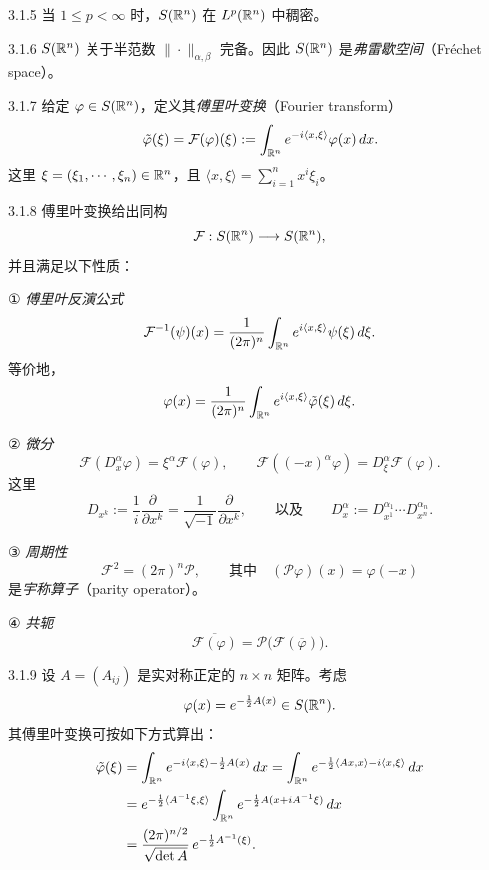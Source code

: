 
\begin{proposition}{3.1.5}
当 $1\le p<\infty$ 时，$S(\mathbb{R}^n)$ 在 $L^p(\mathbb{R}^n)$ 中稠密。
\end{proposition}

\begin{proposition}{3.1.6}
$S(\mathbb{R}^n)$ 关于半范数 $\|\cdot\|_{\alpha,\beta}$ 完备。因此 $S(\mathbb{R}^n)$ 是\emph{弗雷歇空间}（Fréchet space）。
\end{proposition}

\begin{definition}{3.1.7}
给定 $\varphi\in S(\mathbb{R}^n)$，定义其\emph{傅里叶变换}（Fourier transform）
\[
\tilde\varphi(\xi)=\mathcal{F}(\varphi)(\xi):=\int_{\mathbb{R}^n}e^{-i\langle x,\xi\rangle}\varphi(x)\,dx.
\]
这里 $\xi=(\xi_1,\cdots,\xi_n)\in\mathbb{R}^n$，且 $\langle x,\xi\rangle=\sum_{i=1}^n x^i\xi_i$。
\end{definition}

\begin{theorem}{3.1.8}
傅里叶变换给出同构
\[
\mathcal{F}:S(\mathbb{R}^n)\longrightarrow S(\mathbb{R}^n),
\]
并且满足以下性质：

① \emph{傅里叶反演公式}
\[
\mathcal{F}^{-1}(\psi)(x)=\frac{1}{(2\pi)^n}\int_{\mathbb{R}^n}e^{i\langle x,\xi\rangle}\psi(\xi)\,d\xi.
\]
等价地，
\[
\varphi(x)=\frac{1}{(2\pi)^n}\int_{\mathbb{R}^n}e^{i\langle x,\xi\rangle}\tilde\varphi(\xi)\,d\xi.
\]

② \emph{微分}
\[
\mathcal{F}(D_{x}^\alpha\varphi)=\xi^\alpha\mathcal{F}(\varphi),\qquad
\mathcal{F}((-x)^\alpha\varphi)=D_{\xi}^\alpha\mathcal{F}(\varphi).
\]
这里
\[
D_{x^k}:=\frac1i\frac{\partial}{\partial x^k}=\frac{1}{\sqrt{-1}}\frac{\partial}{\partial x^k},
\qquad\text{以及}\qquad
D_{x}^\alpha:=D_{x^1}^{\alpha_1}\cdots D_{x^n}^{\alpha_n}.
\]

③ \emph{周期性}
\[
\mathcal{F}^2=(2\pi)^n\mathcal{P},\qquad\text{其中}\quad (\mathcal{P}\varphi)(x)=\varphi(-x)
\]
是\emph{宇称算子}（parity operator）。

④ \emph{共轭}
\[
\overline{\mathcal{F}(\varphi)}=\mathcal{P}\bigl(\mathcal{F}(\overline{\varphi})\bigr).
\]
\end{theorem}

\begin{example}{3.1.9}
设 $A=(A_{ij})$ 是实对称正定的 $n\times n$ 矩阵。考虑
\[
\varphi(x)=e^{-\frac12A(x)}\in S(\mathbb{R}^n).
\]
其傅里叶变换可按如下方式算出：
\begin{align*}
\tilde\varphi(\xi)
&=\int_{\mathbb{R}^n}e^{-i\langle x,\xi\rangle-\frac12A(x)}\,dx
=\int_{\mathbb{R}^n}e^{-\frac12\langle Ax,x\rangle-i\langle x,\xi\rangle}\,dx\\
&=e^{-\frac12\langle A^{-1}\xi,\xi\rangle}\int_{\mathbb{R}^n}e^{-\frac12A(x+iA^{-1}\xi)}\,dx\\
&=\frac{(2\pi)^{n/2}}{\sqrt{\det A}}\,e^{-\frac12A^{-1}(\xi)}.
\end{align*}
\end{example}

